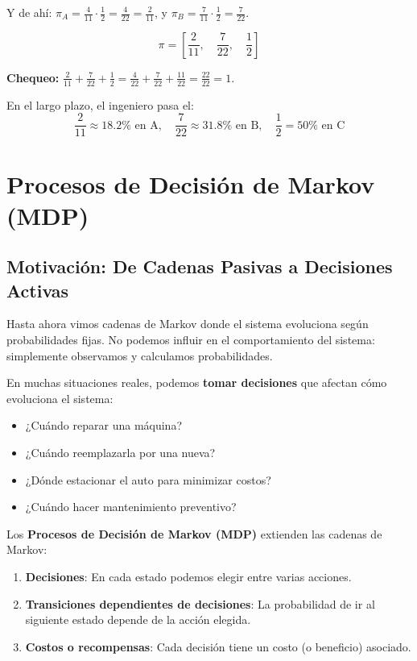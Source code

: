 \documentclass[a4paper,11pt]{article}
\begin{document}
Y de ahí: $\pi_A = \frac{4}{11} \cdot \frac{1}{2} = \frac{4}{22} = \frac{2}{11}$, y $\pi_B = \frac{7}{11} \cdot \frac{1}{2} = \frac{7}{22}$.

\[
\pi = \left[ \frac{2}{11}, \quad \frac{7}{22}, \quad \frac{1}{2} \right]
\]

\textbf{Chequeo:} $\frac{2}{11} + \frac{7}{22} + \frac{1}{2} = \frac{4}{22} + \frac{7}{22} + \frac{11}{22} = \frac{22}{22} = 1$. \checkmark

En el largo plazo, el ingeniero pasa el:
\[
\boxed{\frac{2}{11} \approx 18.2\% \text{ en A}}, \quad
\boxed{\frac{7}{22} \approx 31.8\% \text{ en B}}, \quad
\boxed{\frac{1}{2} = 50\% \text{ en C}}
\]

\section{Procesos de Decisión de Markov (MDP)}

\subsection{Motivación: De Cadenas Pasivas a Decisiones Activas}

Hasta ahora vimos cadenas de Markov donde el sistema evoluciona según probabilidades fijas. No podemos influir en el comportamiento del sistema: simplemente observamos y calculamos probabilidades.

\vspace{0.5em}

En muchas situaciones reales, podemos \textbf{tomar decisiones} que afectan cómo evoluciona el sistema:

\begin{itemize}
    \item ¿Cuándo reparar una máquina?
    \item ¿Cuándo reemplazarla por una nueva?
    \item ¿Dónde estacionar el auto para minimizar costos?
    \item ¿Cuándo hacer mantenimiento preventivo?
\end{itemize}

Los \textbf{Procesos de Decisión de Markov (MDP)} extienden las cadenas de Markov:

\begin{enumerate}
    \item \textbf{Decisiones}: En cada estado podemos elegir entre varias acciones.
    \item \textbf{Transiciones dependientes de decisiones}: La probabilidad de ir al siguiente estado depende de la acción elegida.
    \item \textbf{Costos o recompensas}: Cada decisión tiene un costo (o beneficio) asociado.
\end{enumerate}
\end{document}
